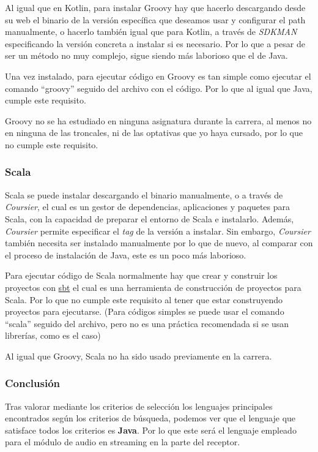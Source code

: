 \begin{todolist}
    \item Al igual que en Kotlin, para instalar Groovy hay que hacerlo
    descargando desde su web el binario de la versión específica que deseamos
    usar y configurar el path manualmente, o hacerlo también igual que para
    Kotlin, a través de \emph{SDKMAN} especificando la versión concreta a
    instalar si es necesario. Por lo que a pesar de ser un método no muy
    complejo, sigue siendo más laborioso que el de Java.
    \item[\xcmark] Una vez instalado, para ejecutar código en Groovy es tan
    simple como ejecutar el comando ``groovy'' seguido del archivo con el
    código. Por lo que al igual que Java, cumple este requisito.
    \item Groovy no se ha estudiado en ninguna asignatura durante la carrera, al
    menos no en ninguna de las troncales, ni de las optativas que yo haya
    cursado, por lo que no cumple este requisito.
\end{todolist}

\subsubsection{Scala}

\begin{todolist}
    \item Scala se puede instalar descargando el binario manualmente, o a través
    de \emph{Coursier}, el cual es un gestor de dependencias, aplicaciones y
    paquetes para Scala, con la capacidad de preparar el entorno de
    Scala e instalarlo. Además, \emph{Coursier} permite especificar el \emph{tag} de la
    versión a instalar. Sin embargo, \emph{Coursier} también necesita ser
    instalado manualmente por lo que de nuevo, al comparar con el proceso de
    instalación de Java, este es un poco más laborioso.
    \item Para ejecutar código de Scala normalmente hay que crear y construir
    los proyectos con \href{https://www.scala-sbt.org/}{sbt} el cual es una
    herramienta de construcción de proyectos para Scala. Por lo que no cumple
    este requisito al tener que estar construyendo proyectos para ejecutarse.
    (Para códigos simples se puede usar el comando ``scala'' seguido del
    archivo, pero no es una práctica recomendada si se usan librerías, como es
    el caso)
    \item Al igual que Groovy, Scala no ha sido usado previamente en la carrera.
\end{todolist}


\subsubsection{Conclusión}

Tras valorar mediante los criterios de selección los lenguajes principales
encontrados según los criterios de búsqueda, podemos ver que el lenguaje que
satisface todos los criterios es \textbf{Java}. Por lo que este será el lenguaje
empleado para el módulo de audio en streaming en la parte del receptor.